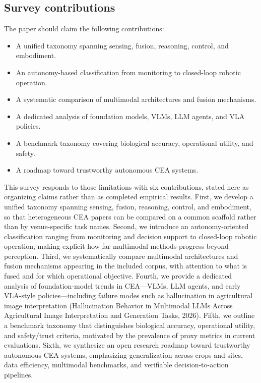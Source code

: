 \documentclass[lettersize,journal]{IEEEtran}
\begin{document}
\subsection{Survey contributions}

The paper should claim the following contributions:

\begin{itemize}
    \item A unified taxonomy spanning sensing, fusion, reasoning, control, and embodiment.
\item An autonomy-based classification from monitoring to closed-loop robotic operation.
\item A systematic comparison of multimodal architectures and fusion mechanisms.
\item A dedicated analysis of foundation models, VLMs, LLM agents, and VLA policies.
\item A benchmark taxonomy covering biological accuracy, operational utility, and safety.
\item A roadmap toward trustworthy autonomous CEA systems.
\end{itemize}

This survey responds to those limitations with six contributions, stated here as organizing claims rather than as completed empirical results. First, we develop a unified taxonomy spanning sensing, fusion, reasoning, control, and embodiment, so that heterogeneous CEA papers can be compared on a common scaffold rather than by venue-specific task names. Second, we introduce an autonomy-oriented classification ranging from monitoring and decision support to closed-loop robotic operation, making explicit how far multimodal methods progress beyond perception. Third, we systematically compare multimodal architectures and fusion mechanisms appearing in the included corpus, with attention to what is fused and for which operational objective. Fourth, we provide a dedicated analysis of foundation-model trends in CEA---VLMs, LLM agents, and early VLA-style policies---including failure modes such as hallucination in agricultural image interpretation (Hallucination Behavior in Multimodal LLMs Across Agricultural Image Interpretation and Generation Tasks, 2026). Fifth, we outline a benchmark taxonomy that distinguishes biological accuracy, operational utility, and safety/trust criteria, motivated by the prevalence of proxy metrics in current evaluations. Sixth, we synthesize an open research roadmap toward trustworthy autonomous CEA systems, emphasizing generalization across crops and sites, data efficiency, multimodal benchmarks, and verifiable decision-to-action pipelines.
\end{document}
